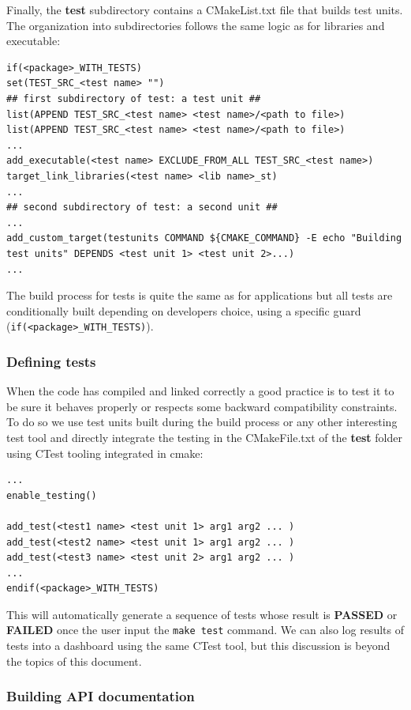 \documentclass[12pt,a4paper]{article}
\begin{document}
Finally, the \textbf{test} subdirectory contains a CMakeList.txt file that builds test units. The organization into subdirectories follows the same logic as for libraries and executable:
\begin{verbatim}
if(<package>_WITH_TESTS)
set(TEST_SRC_<test name> "")
## first subdirectory of test: a test unit ##
list(APPEND TEST_SRC_<test name> <test name>/<path to file>)
list(APPEND TEST_SRC_<test name> <test name>/<path to file>)
...
add_executable(<test name> EXCLUDE_FROM_ALL TEST_SRC_<test name>)
target_link_libraries(<test name> <lib name>_st)
...
## second subdirectory of test: a second unit ##
...
add_custom_target(testunits COMMAND ${CMAKE_COMMAND} -E echo "Building 
test units" DEPENDS <test unit 1> <test unit 2>...)
...
\end{verbatim}
The build process for tests is quite the same as for applications but all tests are conditionally built depending on developers choice, using a specific guard (\verb|if(<package>_WITH_TESTS)|). 


\subsubsection{Defining tests}

When the code has compiled and linked correctly a good practice is to test it to be sure it behaves properly or respects some backward compatibility constraints. To do so we use test units built during the build process or any other interesting test tool and directly integrate the testing in the CMakeFile.txt of the \textbf{test} folder using CTest tooling integrated in cmake:

\begin{verbatim}
...
enable_testing()

add_test(<test1 name> <test unit 1> arg1 arg2 ... )
add_test(<test2 name> <test unit 1> arg1 arg2 ... )
add_test(<test3 name> <test unit 2> arg1 arg2 ... )
...
endif(<package>_WITH_TESTS)
\end{verbatim}

This will automatically generate a sequence of tests whose result is \textbf{PASSED} or \textbf{FAILED} once the user input the \texttt{make test} command. We can also log results of tests into a dashboard using the same CTest tool, but this discussion is beyond the topics of this document.

\subsubsection{Building API documentation}
\end{document}
